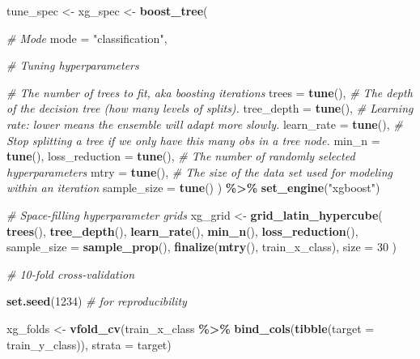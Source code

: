\documentclass[
]{book}
\newenvironment{Shaded}{\begin{snugshade}}{\end{snugshade}}
\newcommand{\CommentTok}[1]{\textcolor[rgb]{0.56,0.35,0.01}{\textit{#1}}}
\newcommand{\DataTypeTok}[1]{\textcolor[rgb]{0.13,0.29,0.53}{#1}}
\newcommand{\DecValTok}[1]{\textcolor[rgb]{0.00,0.00,0.81}{#1}}
\newcommand{\KeywordTok}[1]{\textcolor[rgb]{0.13,0.29,0.53}{\textbf{#1}}}
\newcommand{\NormalTok}[1]{#1}
\newcommand{\OperatorTok}[1]{\textcolor[rgb]{0.81,0.36,0.00}{\textbf{#1}}}
\newcommand{\StringTok}[1]{\textcolor[rgb]{0.31,0.60,0.02}{#1}}
\begin{document}
\begin{Shaded}
\begin{Highlighting}[]
\NormalTok{tune\_spec \textless{}{-}}\StringTok{ }
\StringTok{  }\NormalTok{xg\_spec \textless{}{-}}\StringTok{ }\KeywordTok{boost\_tree}\NormalTok{(}
  
           \CommentTok{\# Mode }
           \DataTypeTok{mode =} \StringTok{"classification"}\NormalTok{,}
           
           \CommentTok{\# Tuning hyperparameters}
           
           \CommentTok{\# The number of trees to fit, aka boosting iterations}
           \DataTypeTok{trees =} \KeywordTok{tune}\NormalTok{(),}
           \CommentTok{\# The depth of the decision tree (how many levels of splits).}
             \DataTypeTok{tree\_depth =} \KeywordTok{tune}\NormalTok{(), }
           \CommentTok{\# Learning rate: lower means the ensemble will adapt more slowly.}
           \DataTypeTok{learn\_rate =} \KeywordTok{tune}\NormalTok{(),}
           \CommentTok{\# Stop splitting a tree if we only have this many obs in a tree node.}
             \DataTypeTok{min\_n =} \KeywordTok{tune}\NormalTok{(),}
           \DataTypeTok{loss\_reduction =} \KeywordTok{tune}\NormalTok{(),}
           \CommentTok{\# The number of randomly selected hyperparameters }
           \DataTypeTok{mtry =} \KeywordTok{tune}\NormalTok{(), }
           \CommentTok{\# The size of the data set used for modeling within an iteration}
           \DataTypeTok{sample\_size =} \KeywordTok{tune}\NormalTok{()}
\NormalTok{          ) }\OperatorTok{\%\textgreater{}\%}\StringTok{ }
\StringTok{  }\KeywordTok{set\_engine}\NormalTok{(}\StringTok{"xgboost"}\NormalTok{) }

\CommentTok{\# Space{-}filling hyperparameter grids }
\NormalTok{xg\_grid \textless{}{-}}\StringTok{ }\KeywordTok{grid\_latin\_hypercube}\NormalTok{(}
  \KeywordTok{trees}\NormalTok{(),}
  \KeywordTok{tree\_depth}\NormalTok{(),}
  \KeywordTok{learn\_rate}\NormalTok{(),}
  \KeywordTok{min\_n}\NormalTok{(),}
  \KeywordTok{loss\_reduction}\NormalTok{(), }
  \DataTypeTok{sample\_size =} \KeywordTok{sample\_prop}\NormalTok{(),}
  \KeywordTok{finalize}\NormalTok{(}\KeywordTok{mtry}\NormalTok{(), train\_x\_class),}
  \DataTypeTok{size =} \DecValTok{30}
\NormalTok{  )}

\CommentTok{\# 10{-}fold cross{-}validation}

\KeywordTok{set.seed}\NormalTok{(}\DecValTok{1234}\NormalTok{) }\CommentTok{\# for reproducibility }

\NormalTok{xg\_folds \textless{}{-}}\StringTok{ }\KeywordTok{vfold\_cv}\NormalTok{(train\_x\_class }\OperatorTok{\%\textgreater{}\%}\StringTok{ }\KeywordTok{bind\_cols}\NormalTok{(}\KeywordTok{tibble}\NormalTok{(}\DataTypeTok{target =}\NormalTok{ train\_y\_class)),}
                     \DataTypeTok{strata =}\NormalTok{ target)}
\end{Highlighting}
\end{Shaded}
\end{document}
